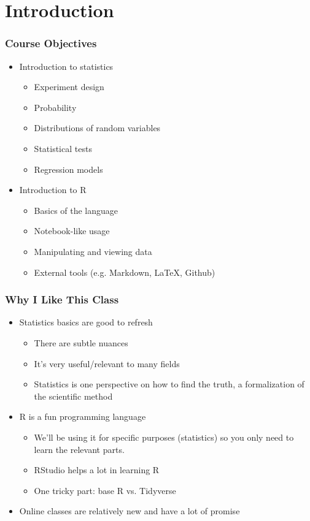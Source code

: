 
\section{Introduction}


\begin{frame}
\frametitle{Course Objectives}
\begin{itemize}[<+->]
\item Introduction to statistics
  \begin{itemize}
  \item Experiment design
  \item Probability
  \item Distributions of random variables
  \item Statistical tests
  \item Regression models
  \end{itemize}
\item Introduction to R
  \begin{itemize}
  \item Basics of the language
  \item Notebook-like usage
  \item Manipulating and viewing data
  \item External tools (e.g. Markdown, \LaTeX, Github)
  \end{itemize}
\end{itemize}
\end{frame}


\begin{frame}
  \frametitle{Why I Like This Class}
  \begin{itemize}[<+->]
  \item Statistics basics are good to refresh
    \begin{itemize}
    \item There are subtle nuances
    \item It's very useful/relevant to many fields
    \item Statistics is one perspective on how to find the truth, a
      formalization of the scientific method
    \end{itemize}
  \item R is a fun programming language
    \begin{itemize}
      \item We'll be using it for specific purposes (statistics) so
        you only need to learn the relevant parts.
      \item RStudio helps a lot in learning R
      \item One tricky part: base R vs. Tidyverse
    \end{itemize}
  \item Online classes are relatively new and have a lot of promise
  \end{itemize}
\end{frame}

